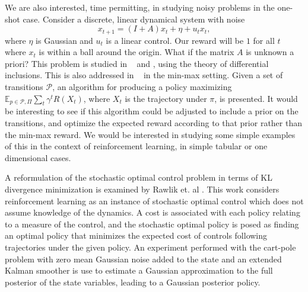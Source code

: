 \documentclass{article}
\begin{document}
We are also interested, time permitting, in studying noisy problems in the one-shot case. Consider a discrete, linear dynamical system with noise
\[
    x_{t+1} = (I + A) x_t + \eta + u_t x_t,
\]
where $\eta$ is Gaussian and $u_t$ is a linear control. Our reward will be $1$ for all $t$ where $x_t$ is within a ball around the origin. What if the matrix $A$ is unknown a priori? This problem is studied in ~\cite{ornikIsraelTopcu} and \cite{ahmadiIsraelTopcu}, using the theory of differential inclusions. This is also addressed in ~\cite{bagnellNgSchneider} in the min-max setting. Given a set of transitions $\mathcal P$, an algorithm for producing a policy maximizing $\mathbb E_{p \in \mathcal P, \Pi} \sum\limits_t \gamma^t R(X_t)$, where $X_t$ is the trajectory under $\pi$, is presented. It would be interesting to see if this algorithm could be adjusted to include a prior on the transitions, and optimize the expected reward according to that prior rather than the min-max reward. We would be interested in studying some simple examples of this in the context of reinforcement learning, in simple tabular or one dimensional cases. 



A reformulation of the stochastic optimal control problem in terms of KL divergence minimization is examined by Rawlik et. al \cite{rawlik2013stochastic}. This work considers reinforcement learning as an instance of stochastic optimal control which does not assume knowledge of the dynamics.  A cost is associated with each policy relating to a measure of the control, and the stochastic optimal policy is posed as finding an optimal policy that minimizes the expected cost of controls following trajectories under the given policy. An experiment performed with the cart-pole problem with zero mean Gaussian noise added to the state and an extended Kalman smoother \cite{stengel1986stochastic} is use to estimate a Gaussian approximation to the full posterior of the state variables, leading to a Gaussian posterior policy.

\end{document}
